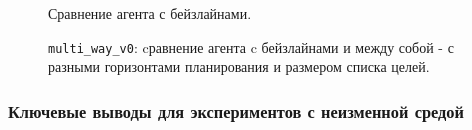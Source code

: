\documentclass[a4paper]{article}
\begin{document}
\begin{figure}
  \centering
  \begin{minipage}{.32\linewidth}
    
  \end{minipage}
  \begin{minipage}{.32\linewidth}
    
  \end{minipage}
  \begin{minipage}{.32\linewidth}
    
  \end{minipage}
  \caption{Сравнение агента с бейзлайнами.}
\end{figure}

\begin{figure}
  \centering
  \begin{minipage}{.98\linewidth}
    
  \end{minipage}

  \begin{minipage}{.49\linewidth}
    
  \end{minipage}
  \begin{minipage}{.49\linewidth}
    
  \end{minipage}
  
  \begin{minipage}{.49\linewidth}
    
  \end{minipage}
  \begin{minipage}{.49\linewidth}
    
  \end{minipage}

  \caption{ \texttt{multi\_way\_v0}: cравнение агента c бейзлайнами и между собой - с разными горизонтами планирования и размером списка целей.}
\end{figure}

\subsubsection{Ключевые выводы для экспериментов с неизменной средой}
\end{document}
